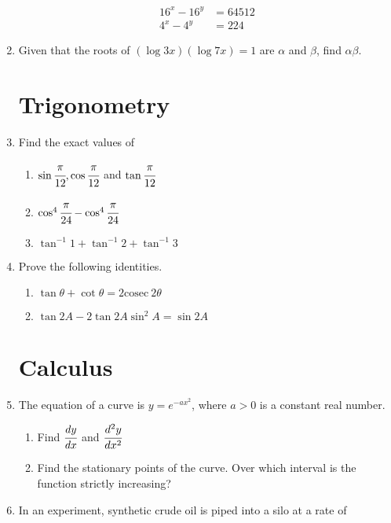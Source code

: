 \documentclass[letterpaper]{article}
\begin{document}
\begin{enumerate}
\begin{align}
16^x - 16^y &= 64512 \\
4^x - 4^y &= 224
\end{align}

\item Given that the roots of $(\log 3x)(\log 7x) = 1$ are $\alpha$ and $\beta$, find $\alpha\beta$.

\section*{Trigonometry}

\item Find the exact values of 

\begin{enumerate}
\item $\sin{\cfrac{\pi}{12}}, \cos{\cfrac{\pi}{12}}$ and $\tan{\cfrac{\pi}{12}}$
\item $\cos^4{\cfrac{\pi}{24}} - \cos^4{\cfrac{\pi}{24}}$
\item $\tan^{-1} 1 + \tan^{-1} 2 + \tan^{-1} 3$
\end{enumerate}

\item Prove the following identities.

\begin{enumerate}
\item $\tan \theta + \cot \theta = 2\mathrm{cosec}\ 2\theta$
\item $\tan 2A - 2 \tan 2A \sin^2 A = \sin 2A$
\end{enumerate}

\section*{Calculus}

\item The equation of a curve is $y = e^{-ax^2}$, where $a > 0$ is a constant real number. 

\begin{enumerate}
\item Find $\cfrac{dy}{dx}$ and $\cfrac{d^2y}{dx^2}$
\item Find the stationary points of the curve. Over which interval is the function strictly increasing?
\end{enumerate}

\item In an experiment, synthetic crude oil is piped into a silo at a rate of 


\end{enumerate}
\end{document}
